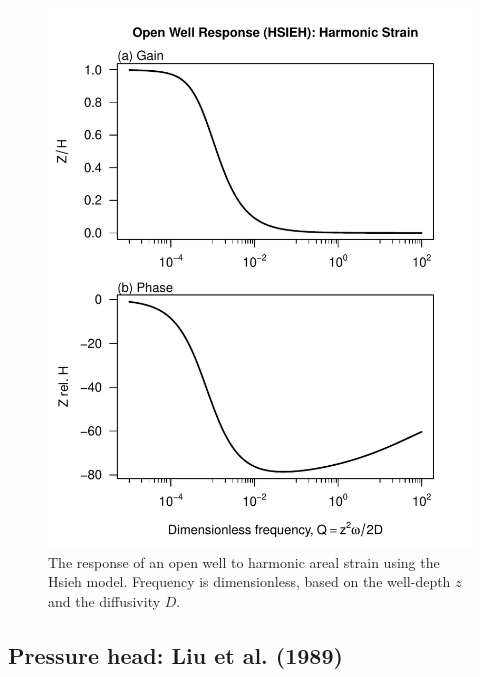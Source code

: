\documentclass[12pt]{article}\usepackage[]{graphicx}\usepackage[]{color}
\makeatletter
\def\maxwidth{ %
  \ifdim\Gin@nat@width>\linewidth
    \linewidth
  \else
    \Gin@nat@width
  \fi
}
\newenvironment{knitrout}{}{} %
\makeatother
\begin{document}
\begin{figure}[htb!]
\begin{center}
\begin{knitrout}\small
{}\color{fgcolor}
\includegraphics[width=\maxwidth]{figure/HSIEHRESPFIG-1} 

\end{knitrout}
\caption{The response of an open well to harmonic areal strain using
the Hsieh model. 
Frequency is dimensionless, based on the well-depth $z$ and the diffusivity $D$.
}
\label{fig:owrsp-hsi}
\end{center}
\end{figure}

\clearpage
\subsection{Pressure head: Liu et al. (1989)}
\end{document}
